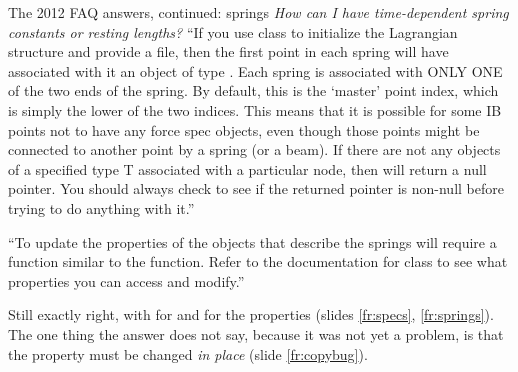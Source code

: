 \documentclass[aspectratio=169,11pt]{beamer}
\begin{document}
\begin{frame}{The 2012 FAQ answers, continued: springs}
\label{fr:faq2}
\small \emph{How can I have time-dependent spring constants or resting lengths?} ``If you use class  to initialize the Lagrangian structure and provide a  file, then the first point in each spring will have associated with it an object of type . Each spring is associated with ONLY ONE of the two ends of the spring. By default, this is the `master' point index, which is simply the lower of the two indices. This means that it is possible for some IB points not to have any force spec objects, even though those points might be connected to another point by a spring (or a beam). If there are not any objects of a specified type T associated with a particular node, then  will return a null pointer. You should always check to see if the returned pointer is non-null before trying to do anything with it.''
\vspace{1mm}

\small ``To update the properties of the objects that describe the springs will require a function similar to the  function. Refer to the documentation for class  to see what properties you can access and modify.''
\vspace{1mm}

\footnotesize Still exactly right, with  for  and  for the properties (slides \ref{fr:specs}, \ref{fr:springs}). The one thing the answer does not say, because it was not yet a problem, is that the property must be changed \emph{in place} (slide \ref{fr:copybug}).
\end{frame}
\end{document}
